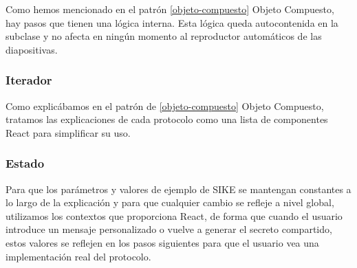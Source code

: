 Como hemos mencionado en el patrón \ref{objeto-compuesto} Objeto Compuesto, hay pasos que tienen una lógica interna. Esta lógica queda autocontenida en la subclase y no afecta en ningún momento al reproductor automáticos de las diapositivas.

\subsubsection{Iterador}

Como explicábamos en el patrón de \ref{objeto-compuesto} Objeto Compuesto, tratamos las explicaciones de cada protocolo como una lista de componentes React para simplificar su uso.

\subsubsection{Estado}

Para que los parámetros y valores de ejemplo de SIKE se mantengan constantes a lo largo de la explicación y para que cualquier cambio se refleje a nivel global, utilizamos los contextos que proporciona React, de forma que cuando el usuario introduce un mensaje personalizado o vuelve a generar el secreto compartido, estos valores se reflejen en los pasos siguientes para que el usuario vea una implementación real del protocolo.